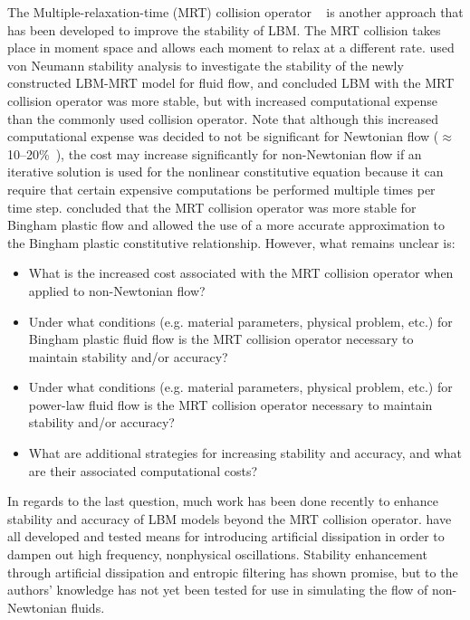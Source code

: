 The Multiple-relaxation-time (MRT) collision operator ~\cite{d1994generalized} is another approach that has been developed to improve the stability of LBM.
The MRT collision takes place in moment space and allows each moment to relax at a different rate.
\cite{lallemand2000theory} used von Neumann stability analysis to investigate the stability of the newly constructed LBM-MRT model for fluid flow, and concluded LBM with the MRT collision operator was more stable, but with increased computational expense than the commonly used collision operator.
Note that although this increased computational expense was decided to not be significant for Newtonian flow ($\approx$ 10--20\%~\cite{lallemand2000theory}), the cost may increase significantly for non-Newtonian flow if an iterative solution is used for the nonlinear constitutive equation because it can require that certain expensive computations be performed multiple times per time step.
\cite{chen2014simulations} concluded that the MRT collision operator was more stable for Bingham plastic flow and allowed the use of a more accurate approximation to the Bingham plastic constitutive relationship.
However, what remains unclear is:
\begin{itemize}
    \item What is the increased cost associated with the MRT collision operator when applied to non-Newtonian flow?
    \item Under what conditions (e.g. material parameters, physical problem, etc.) for Bingham plastic fluid flow is the MRT collision operator necessary to maintain stability and/or accuracy?
    \item Under what conditions (e.g. material parameters, physical problem, etc.) for power-law fluid flow is the MRT collision operator necessary to maintain stability and/or accuracy?
    \item What are additional strategies for increasing stability and accuracy, and what are their associated computational costs?
\end{itemize}
In regards to the last question, much work has been done recently to enhance stability and accuracy of LBM models beyond the MRT collision operator.
\cite{brownlee2006stabilization,brownlee2007stability,brownlee2008nonequilibrium,packwood2009entropy,gorban2014enhancement} have all developed and tested means for introducing artificial dissipation in order to dampen out high frequency, nonphysical oscillations.
Stability enhancement through artificial dissipation and entropic filtering has shown promise, but to the authors' knowledge has not yet been tested for use in simulating the flow of non-Newtonian fluids.

